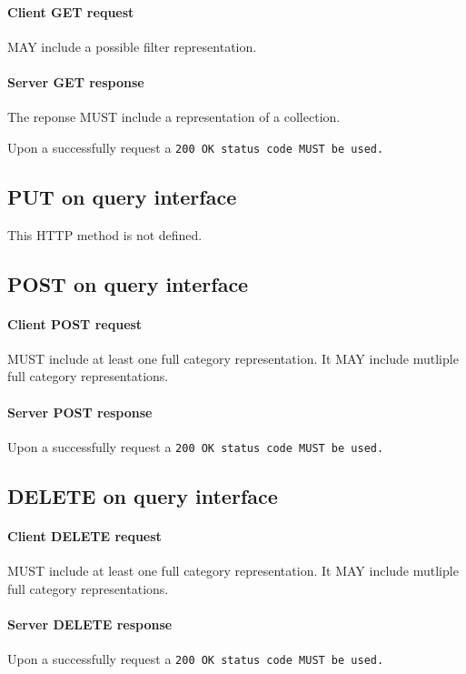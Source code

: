 \documentclass[10pt,a4paper]{article}
\begin{document}
\paragraph{Client GET request}
MAY include a possible filter representation.

\paragraph{Server GET response}
The reponse MUST include a representation of a collection.

Upon a successfully request a \tt{200 OK} status code MUST be used.

\subsection{PUT on query interface}

This HTTP method is not defined.

\subsection{POST on query interface}

\paragraph{Client POST request}
MUST include at least one full category representation. It MAY include mutliple full category representations.

\paragraph{Server POST response}
Upon a successfully request a \tt{200 OK} status code MUST be used.

\subsection{DELETE on query interface}

\paragraph{Client DELETE request}
MUST include at least one full category representation. It MAY include mutliple full category representations.

\paragraph{Server DELETE response}
Upon a successfully request a \tt{200 OK} status code MUST be used.
\end{document}
